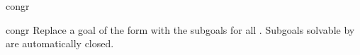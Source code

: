 \begin{tactic}{congr}
  \begin{tsyntax}[empty]{congr}
  Replace a goal of the form  with the subgoals
   for all . Subgoals solvable by  are
  automatically closed.
  \end{tsyntax}
\end{tactic}
